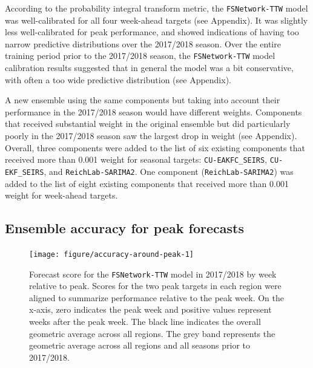\documentclass{article}\usepackage[]{graphicx}\usepackage[]{color}
\newenvironment{knitrout}{}{} %
\begin{document}
According to the probability integral transform metric\cite{angus1994probability,diebold1997evaluating}, the {\tt FSNetwork-TTW} model was well-calibrated for all four week-ahead targets (see Appendix).
It was slightly less well-calibrated for peak performance, and showed indications of having too narrow predictive distributions over the 2017/2018 season.
Over the entire training period prior to the 2017/2018 season, the {\tt FSNetwork-TTW} model calibration results suggested that in general the model was a bit conservative, with often a too wide predictive distribution (see Appendix).






A new ensemble using the same components but taking into account their performance in the 2017/2018 season would have different weights.
Components that received substantial weight in the original ensemble but did particularly poorly in the 2017/2018 season saw the largest drop in weight (see Appendix). 
Overall, three components were added to the list of six existing components that received more than 0.001 weight for seasonal targets: {\tt CU-EAKFC\_SEIRS}, {\tt CU-EKF\_SEIRS}, and {\tt ReichLab-SARIMA2}.
One component ({\tt ReichLab-SARIMA2}) was added to the list of eight existing components that received more than 0.001 weight for week-ahead targets.


\subsection*{Ensemble accuracy for peak forecasts}

\begin{knitrout}
\color{fgcolor}\begin{figure}
\texttt{[image: figure/accuracy-around-peak-1]} \caption[Forecast score for the {\tt FSNetwork-TTW} model in 2017/2018 by week relative to peak]{Forecast score for the {\tt FSNetwork-TTW} model in 2017/2018 by week relative to peak. Scores for the two peak targets in each region were aligned to summarize performance relative to the peak week. On the x-axis, zero indicates the peak week and positive values represent weeks after the peak week. The black line indicates the overall geometric average across all regions. The grey band represents the geometric average across all regions and all seasons prior to 2017/2018.}\label{fig:accuracy-around-peak}
\end{figure}


\end{knitrout}
\end{document}
